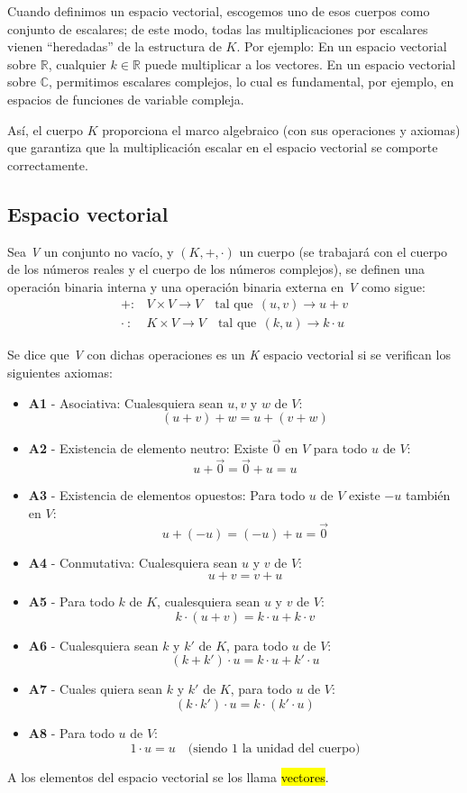 Cuando definimos un espacio vectorial, escogemos uno de esos cuerpos como conjunto de escalares; de este modo, todas las multiplicaciones por escalares vienen ``heredadas'' de la estructura de \(K\). Por ejemplo: En un espacio vectorial sobre \(\mathbb{R}\), cualquier \(k\in\mathbb{R}\) puede multiplicar a los vectores. En un espacio vectorial sobre \(\mathbb{C}\), permitimos escalares complejos, lo cual es fundamental, por ejemplo, en espacios de funciones de variable compleja.

Así, el cuerpo \(K\) proporciona el marco algebraico (con sus operaciones y axiomas) que garantiza que la multiplicación escalar en el espacio vectorial se comporte correctamente.

\subsection{Espacio vectorial}

Sea \textit{V} un conjunto no vacío, y \(\left(K, +, \cdot\right)\) un cuerpo (se trabajará con el cuerpo de los números reales y el cuerpo de los números complejos), se definen una operación binaria interna y una operación binaria externa en \textit{V} como sigue:
\begin{align*}
  +:& V \times V \rightarrow V \quad \text{tal que}~~ (u,v) \rightarrow u+v \\
  \cdot ~ :& K \times V \rightarrow V \quad \text{tal que}~~ (k,u) \rightarrow k\cdot u
\end{align*}

Se dice que \textit{V} con dichas operaciones es un \textit{K} espacio vectorial si se verifican los siguientes axiomas:
\begin{itemize}
  \item \textbf{A1} - Asociativa: Cualesquiera sean \(u,v\) y \(w\) de \(V\): \[
    (u+v)+w = u + (v+w)
  \]
  \item \textbf{A2} - Existencia de elemento neutro: Existe \(\vec{0}\) en \(V\) para todo \(u\) de \(V\):\[
    u+\vec{0}=\vec{0}+u = u
  \]
  \item \textbf{A3} - Existencia de elementos opuestos: Para todo \(u\) de \(V\) existe \(-u\) también en \(V\):\[
    u + (-u) = (-u) + u = \vec{0}
  \]
  \item \textbf{A4} - Conmutativa: Cualesquiera sean \(u\) y \(v\) de \(V\): \[
    u + v = v + u
  \]
  \item \textbf{A5} - Para todo \(k\) de \(K\), cualesquiera sean \(u\) y \(v\) de \(V\): \[
    k\cdot (u+v)=k\cdot u+k\cdot v
  \]
  \item \textbf{A6} - Cualesquiera sean \(k\) y \(k'\) de \(K\), para todo \(u\) de \(V\):\[
    (k + k')\cdot u = k \cdot u + k' \cdot u
  \]
  \item \textbf{A7} - Cuales quiera sean \(k\) y \(k'\) de \(K\), para todo \(u\) de \(V\):\[
    (k\cdot k')\cdot u = k \cdot (k' \cdot u)
  \]
  \item \textbf{A8} - Para todo \(u\) de \(V\): \[
    1 \cdot u = u \quad \text{(siendo 1 la unidad del cuerpo)}
  \]
\end{itemize}
A los elementos del espacio vectorial se los llama \hl{vectores}.

